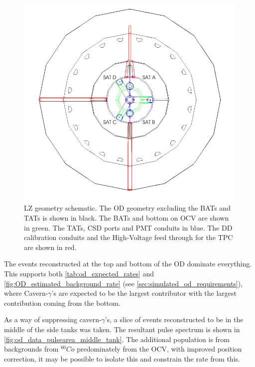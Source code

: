 \begin{figure}[!htbp]
\includegraphics[width=\textwidth]{Figures/Geometry/geometry_with_conduits.png}
\centering
\caption{LZ geometry schematic. The OD geometry excluding the BATs and TATs is shown in black. The BATs and bottom on OCV are shown in green. The TATs, CSD ports and PMT conduits in blue. The DD calibration conduits and the High-Voltage feed through for the TPC are shown in red.}
\label{fig:OD_conduit_geometry}
\end{figure}

\par
The events reconstructed at the top and bottom of the OD dominate everything.
This supports both \autoref{tab:od_expected_rates} and \autoref{fig:OD_estimated_background_rate} (see \autoref{sec:simulated_od_requirements}), where Cavern-$\gamma$'s are expected to be the largest contributor with the largest contribution coming from the bottom. 



\par
As a way of suppressing cavern-$\gamma$'s, a slice of events reconstructed to be in the middle of the side tanks was taken.
The resultant pulse spectrum is shown in  \autoref{fig:od_data_pulsearea_middle_tank}.
The additional population is from backgrounds from ${}^{60}Co$ predominately from the OCV, with improved position correction, it may be possible to isolate this and constrain the rate from this.

